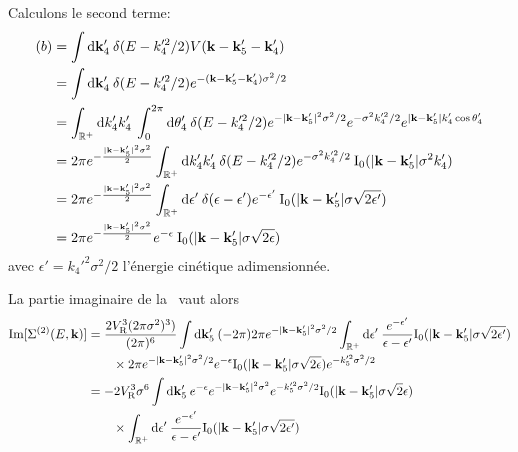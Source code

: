 Calculons le second terme:
\begin{align}
(b)&=\int{\mathop{}\mathopen{}\mathrm{d}\mathbf{k}_{\mathrm{4}}' \: \delta(E-k_{\mathrm{4}}'^2/2) V(\mathbf{k}-\mathbf{k}_{\mathrm{5}}' -\mathbf{k}_{\mathrm{4}}')} \\
&= \int{\mathop{}\mathopen{}\mathrm{d}\mathbf{k}_{\mathrm{4}}' \: \delta(E-k_{\mathrm{4}}'^2/2) e^{-(\mathbf{k}-\mathbf{k}_{\mathrm{5}}'-\mathbf{k}_{\mathrm{4}}')\sigma^2/2}}\\
&=\int_{\mathbb{R}^+}{\mathop{}\mathopen{}\mathrm{d} k_{\mathrm{4}}' k_{\mathrm{4}}' \: \int_0^{2\pi}{\mathop{}\mathopen{}\mathrm{d}\theta_{\mathrm{4}}' \: \delta(E-k_{\mathrm{4}}'^2/2) e^{-|\mathbf{k}-\mathbf{k}_{\mathrm{5}}'|^2\sigma^2/2} e^{-\sigma^2 k_{\mathrm{4}}'^2/2} e^{|\mathbf{k}-\mathbf{k}_{\mathrm{5}}'| k_{\mathrm{4}}' \cos{\theta_{\mathrm{4}}'} } }} \\
&=2\pi e^{-\frac{|\mathbf{k}-\mathbf{k}_{\mathrm{5}}'|^2\sigma^2}{2}} \int_{\mathbb{R}^+}{\mathop{}\mathopen{}\mathrm{d} k_{\mathrm{4}}' k_{\mathrm{4}}' \:\delta(E- k_{\mathrm{4}}'^2/2) e^{-\sigma^2 k_{\mathrm{4}}'^2/2} \: \mathrm{I_0}(|\mathbf{k}-\mathbf{k}_{\mathrm{5}}'| \sigma^2 k_{\mathrm{4}}')}\\
&=2\pi e^{-\frac{|\mathbf{k}-\mathbf{k}_{\mathrm{5}}'|^2\sigma^2}{2}} \int_{\mathbb{R}^+}{\mathop{}\mathopen{}\mathrm{d}\epsilon' \:\delta(\epsilon-\epsilon') e^{-\epsilon'} \: \mathrm{I_0}(|\mathbf{k}-\mathbf{k}_{\mathrm{5}}'| \sigma \sqrt{2\epsilon'})}\\
&=2\pi e^{-\frac{|\mathbf{k}-\mathbf{k}_{\mathrm{5}}'|^2\sigma^2}{2}} e^{-\epsilon} \: \mathrm{I_0}(|\mathbf{k}-\mathbf{k}_{\mathrm{5}}'| \sigma \sqrt{2\epsilon})
\end{align}
avec $\epsilon'=k_{\mathrm{4}}'^2\sigma^2/2$ l'énergie cinétique adimensionnée.

La partie imaginaire de la \selfenergy\ vaut alors
\begin{align}
\mathrm{Im}[ \Sigma^{(2)}(E,\mathbf{k})]&= \frac{2 V_{\mathrm{R}}^3 (2\pi\sigma^2)^3)}{(2\pi)^6} \int{\mathop{}\mathopen{}\mathrm{d}\mathbf{k}_{\mathrm{5}}' \: (-2\pi) 2\pi e^{-|\mathbf{k}-\mathbf{k}_{\mathrm{5}}'|^2\sigma^2/2} \int_{\mathbb{R}^+}{\mathop{}\mathopen{}\mathrm{d}\epsilon' \: \frac{e^{-\epsilon'}}{\epsilon-\epsilon'} \mathrm{I_0}(|\mathbf{k}-\mathbf{k}_{\mathrm{5}}'|\sigma\sqrt{2\epsilon'})}}\\
&\nonumber \qquad \times 2\pi e^{-|\mathbf{k}-\mathbf{k}_{\mathrm{5}}'|^2\sigma^2/2} e^{-\epsilon} \mathrm{I_0}(|\mathbf{k}-\mathbf{k}_{\mathrm{5}}'|\sigma \sqrt{2\epsilon}) e^{-k_{\mathrm{5}}'^2\sigma^2/2} \\
 &= -2V_{\mathrm{R}}^3\sigma^6 \int{\mathop{}\mathopen{}\mathrm{d}\mathbf{k}_{\mathrm{5}}' \: e^{-\epsilon} e^{-|\mathbf{k}-\mathbf{k}_{\mathrm{5}}'|^2 \sigma^2} e^{-k_{\mathrm{5}}'^2 \sigma^2/2} \mathrm{I_0}(|\mathbf{k}-\mathbf{k}_{\mathrm{5}}'|\sigma \sqrt{2}\epsilon)} \\
 &\nonumber \qquad \times \int_{\mathbb{R}^+}{\mathop{}\mathopen{}\mathrm{d} \epsilon' \: \frac{e^{-\epsilon'}}{\epsilon-\epsilon'} \mathrm{I_0}(|\mathbf{k}-\mathbf{k}_{\mathrm{5}}'|\sigma \sqrt{2\epsilon'})}
\end{align}



